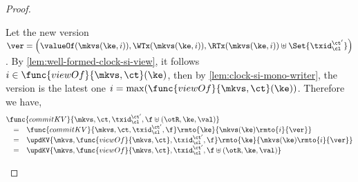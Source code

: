 \begin{proof}
\begin{itemize}
\[{                } 
            \]
            Let the new version \( \ver = \left( \valueOf(\mkvs(\ke,i)), \WTx(\mkvs(\ke,i)), \RTx(\mkvs(\ke,i)) \uplus \Set{\txid_\cl^{\ct'}} \right) \).
            By \cref{lem:well-formed-clock-si-view}, it follows \( i \in \func{viewOf}{\mkvs,\ct}(\ke) \), then by \cref{lem:clock-si-mono-writer}, the version is the latest one \( i = \max(\func{viewOf}{\mkvs,\ct}(\ke)) \).
            Therefore we have,
            \[
                \begin{array}{@{}l@{}}
                \func{commitKV}{\mkvs,\ct,\txid_\cl^{\ct'},\f \uplus (\otR, \ke, \val)}  \\
                \quad \begin{array}[t]{@{}c l@{}}
                = &
                \func{commitKV}{\mkvs,\ct,\txid_\cl^{\ct'},\f}\rmto{\ke}{\mkvs(\ke)\rmto{i}{\ver}} \\
                = & 
                \updKV{\mkvs,\func{viewOf}{\mkvs,\ct},\txid_\cl^{\ct'},\f}\rmto{\ke}{\mkvs(\ke)\rmto{i}{\ver}} \\
                = & 
                \updKV{\mkvs,\func{viewOf}{\mkvs,\ct},\txid_\cl^{\ct'},\f \uplus (\otR, \ke, \val)}
                \end{array}
                \end{array}
            \]
    \end{itemize}
\end{proof}


